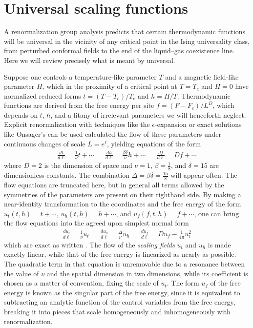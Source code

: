 \documentclass[
aps,
pre,
preprint,
longbibliography,
floatfix
]{revtex4-2}
\begin{document}
\section{Universal scaling functions}

A renormalization group analysis predicts that certain thermodynamic functions
will be universal in the vicinity of any critical point in the Ising
universality class, from perturbed conformal fields to the end of the
liquid--gas coexistence line. Here we will review precisely what is meant by
universal.

Suppose one controls a temperature-like parameter $T$ and a magnetic field-like
parameter $H$, which in the proximity of a critical point at $T=T_c$ and $H=0$
have normalized reduced forms $t=(T-T_c)/T_c$ and $h=H/T$. Thermodynamic
functions are derived from the free energy per site $f=(F-F_c)/L^D$, which
depends on $t$, $h$, and a litany of irrelevant parameters we will henceforth
neglect.  Explicit renormalization with techniques like the
$\epsilon$-expansion or exact solutions like Onsager's can be used calculated
the flow of these parameters under continuous changes of scale $L=e^\ell$,
yielding equations of the form
\begin{align} \label{eq:raw.flow}
  \frac{dt}{d\ell}=\frac1\nu t+\cdots
  &&
  \frac{dh}{d\ell}=\frac{\beta\delta}\nu h+\cdots
  &&
  \frac{df}{d\ell}=Df+\cdots
\end{align}
where $D=2$ is the dimension of space and $\nu=1$, $\beta=\frac18$, and
$\delta=15$ are dimensionless constants. The combination
$\Delta=\beta\delta=\frac{15}8$ will appear often. The flow equations are
truncated here, but in general all terms allowed by the symmetries of the
parameters are present on their righthand side. By making a near-identity
transformation to the coordinates and the free energy of the form $u_t(t,
h)=t+\cdots$, $u_h(t, h)=h+\cdots$, and $u_f(f,t,h)=f+\cdots$, one can bring
the flow equations into the agreed upon simplest normal form
\begin{align} \label{eq:flow}
  \frac{du_t}{d\ell}=\frac1\nu u_t
  &&
  \frac{du_h}{d\ell}=\frac{\Delta}\nu u_h
  &&
  \frac{du_f}{d\ell}=Du_f-\frac1{4\pi}u_t^2
\end{align}
which are exact as written \cite{Raju_2019_Normal}. The flow of the
\emph{scaling fields} $u_t$ and $u_h$ is made exactly linear, while that of the
free energy is linearized as nearly as possible. The quadratic term in that
equation is unremovable due to a resonance between the value of $\nu$ and the
spatial dimension in two dimensions, while its coefficient is chosen as a
matter of convention, fixing the scale of $u_t$. The form $u_f$ of the free
energy is known as the singular part of the free energy, since it is equivalent
to subtracting an analytic function of the control variables from the free
energy, breaking it into pieces that scale homogeneously and inhomogeneously with
renormalization.
\end{document}
